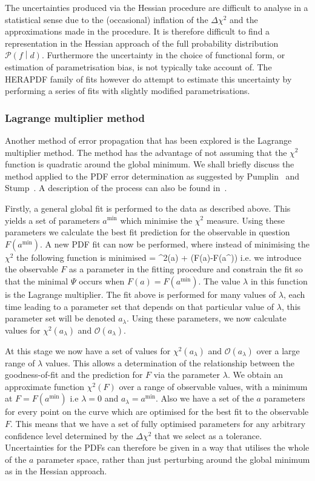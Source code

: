 The uncertainties produced via the Hessian procedure are difficult to analyse in a statistical sense due to the (occasional) inflation of the $\Delta\chi^2$ and the approximations made in the procedure. It is therefore difficult to find a representation in the Hessian approach of the full probability distribution $\mathcal{P}\left(f \middle| d \right)$. Furthermore the uncertainty in the choice of functional form, or estimation of parametrisation bias, is not typically take account of. The HERAPDF family of fits however do attempt to estimate this uncertainty by performing a series of fits with slightly modified parametrisations.

\subsubsection{Lagrange multiplier method}
Another method of error propagation that has been explored is the Lagrange multiplier method. The method has the advantage of not assuming that the $\chi^2$ function is quadratic around the global minimum. We shall briefly discuss the method applied to the PDF error determination as suggested by Pumplin~\cite{Pumplin:2000vx} and Stump~\cite{Stump:2001gu}. A description of the process can also be found in~\cite{DeRoeck:2011na,Martin:2009iq}.

Firstly, a general global fit is performed to the data as described above. This yields a set of parameters ${a^\mathrm{min}}$ which minimise the $\chi^2$ measure. Using these parameters we calculate
the best fit prediction for the observable in question $F(a^\mathrm{min})$. A new PDF fit can now be performed, where instead of minimising the $\chi^2$ the following function is minimised
\be \Psi= \chi^2(a) + \lambda (F(a)-F(a^))\ee
i.e. we introduce the observable $F$ as a parameter in the fitting procedure and constrain the fit so that the minimal $\Psi$ occurs when $F(a)=F(a^\mathrm{min})$. The value $\lambda$ in this function is the Lagrange multiplier. The fit above is performed for many values of $\lambda$, each time leading to a parameter set that depends on that particular value of $\lambda$, this parameter set will be denoted $a_\lambda$. Using these parameters, we now calculate values for $\chi^2(a_\lambda )$ and $\mathcal{O}(a_\lambda )$.

At this stage we now have a set of values for $\chi^2(a_\lambda)$ and $\mathcal{O}(a_\lambda)$ over a large range of $\lambda$ values. This allows a determination of the relationship between the goodness-of-fit and the prediction for $F$ via the parameter $\lambda$. We obtain an approximate function $\chi^2(F)$ over a range of observable values, with a minimum at $F=F(a^\mathrm{min})$ i.e $\lambda=0$ and $a_\lambda=a^\mathrm{min}$. Also we have a set of the $a$ parameters for every point on the curve which are optimised for the best fit to the observable $F$. This means that we have a set of fully optimised parameters for any arbitrary confidence level determined by the $\Delta\chi^2$ that we select as a tolerance. Uncertainties for the PDFs can therefore be given in a way that utilises the whole of the $a$ parameter space, rather than just perturbing around the global minimum as in the Hessian approach.

